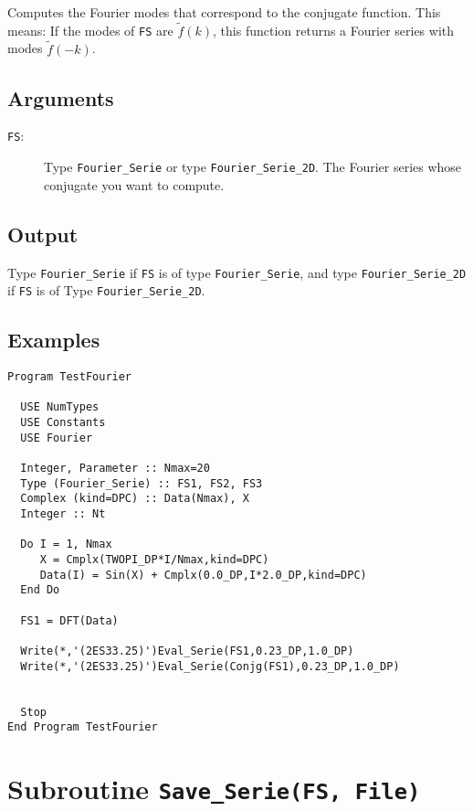 Computes the Fourier modes that correspond to the conjugate
function. This means: If the modes of \texttt{FS} are $\tilde f(k)$,
this function returns a Fourier series with modes $\tilde f(-k)$.

\subsection{Arguments}

\begin{description}
\item[\texttt{FS}:] Type \texttt{Fourier\_Serie} or type
  \texttt{Fourier\_Serie\_2D}. The Fourier series whose conjugate you
  want to compute.
\end{description}

\subsection{Output}

Type \texttt{Fourier\_Serie} if \texttt{FS} is of type
\texttt{Fourier\_Serie}, and type \texttt{Fourier\_Serie\_2D} if
\texttt{FS} is of Type \texttt{Fourier\_Serie\_2D}.

\subsection{Examples}

\begin{verbatim}
Program TestFourier

  USE NumTypes
  USE Constants
  USE Fourier

  Integer, Parameter :: Nmax=20
  Type (Fourier_Serie) :: FS1, FS2, FS3
  Complex (kind=DPC) :: Data(Nmax), X
  Integer :: Nt

  Do I = 1, Nmax
     X = Cmplx(TWOPI_DP*I/Nmax,kind=DPC)
     Data(I) = Sin(X) + Cmplx(0.0_DP,I*2.0_DP,kind=DPC)
  End Do

  FS1 = DFT(Data)

  Write(*,'(2ES33.25)')Eval_Serie(FS1,0.23_DP,1.0_DP)
  Write(*,'(2ES33.25)')Eval_Serie(Conjg(FS1),0.23_DP,1.0_DP)


  Stop
End Program TestFourier
\end{verbatim}

\section{Subroutine \texttt{Save\_Serie(FS, File)}}

